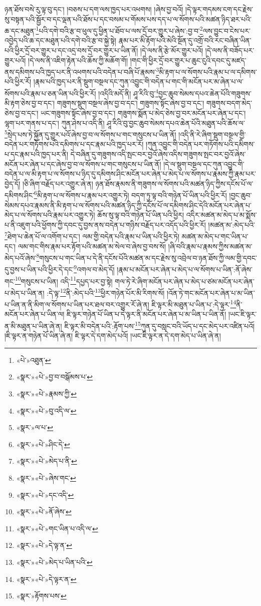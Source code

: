 ཉན་ཐོས་བསེ་རུ་ལྟ་བུ་དང་། །བཅས་པ་དག་ལས་ཁྱད་པར་འཕགས། །ཞེས་བྱ་བའོ། །དེ་ལྟར་གདམས་ངག་དང་རྗེས་སུ་བསྟན་པའི་སྦྱོར་བ་དང་ལྡན་པའི་ཐོས་པ་དང་བསམ་པ་གོམས་པས་དད་པ་ལ་སོགས་པའི་མཚན་ཉིད་ཐར་པའི་ཆ་དང་མཐུན་\footnote{«པེ་»འཐུན་}པའི་དགེ་བའི་རྩ་བ་ཕུལ་དུ་ཕྱིན་པ་ཐོབ་པ་ལས་དྲོ་བར་གྱུར་པ་ཞེས་:བྱ་བ་\footnote{«སྣར་»«པེ་»བྱ་བ་བསྒོམས་པ་}ལས་བྱུང་བ་ངེས་པར་འབྱེད་པའི་ཆ་དང་མཐུན་པའི་དགེ་བའི་རྩ་བ་སྐྱེ་སྟེ། རྣམ་པར་མི་རྟོག་པའི་མེའི་སྔོན་དུ་འགྲོ་བའི་རང་བཞིན་ཡིན་པའི་ཕྱིར་དྲོ་བར་གྱུར་པ་དང་འདྲ་བས་དྲོ་བར་གྱུར་པ་ཡིན་ནོ། །དེ་ལས་ནི་རྩེ་མོར་གྱུར་པའོ། །དེ་ལས་ནི་བཟོད་པར་གྱུར་པའོ། །དེ་ལས་ནི་འཇིག་རྟེན་པའི་ཆོས་ཀྱི་མཆོག་གོ། །གང་གི་ཕྱིར་དྲོ་བར་གྱུར་པ་ཆུང་ངུའི་དབང་དུ་མཛད་ནས་དམིགས་པའི་ཁྱད་པར་ནི་འཕགས་པའི་བདེན་པ་བཞི་པོ་རྣམས་\footnote{«སྣར་»«པེ་»རྣམས་ཀྱི་}མི་རྟག་པ་ལ་སོགས་པའི་རྣམ་པ་ལ་དམིགས་པའི་ཕྱིར་རོ། །རྣམ་པའི་ཁྱད་པར་ནི་སྡུག་བསྔལ་དང་ཀུན་འབྱུང་གི་བདེན་པ་གང་གི་མངོན་པར་མ་ཞེན་པ་ལ་སོགས་པའི་རྣམ་པ་ཅན་ཡིན་པའི་ཕྱིར་རོ། །འདིའི་མདོ་ནི། ཤཱ་རིའི་བུ་\footnote{«སྣར་»«པེ་»བུ་འདི་ལ་}བྱང་ཆུབ་སེམས་དཔའ་ཆེན་པོའི་གཟུགས་མི་རྟག་ཅེས་བྱ་བ་དང་། གཟུགས་སྡུག་བསྔལ་ཞེས་བྱ་བ་དང་། གཟུགས་སྟོང་ཞེས་བྱ་བ་དང་། གཟུགས་བདག་མེད་ཅེས་བྱ་བ་དང་། ཡང་གཟུགས་སྟོང་ཞེས་བྱ་བ་དང་། གཟུགས་སྨོན་པ་མེད་ཅེས་བྱ་བར་མངོན་པར་ཞེན་པ་དང་། ལྷག་པར་གནས་པ་དང་། ཀུན་ཤེས་པ་འདི་ནི། ཤཱ་རིའི་བུ་བྱང་ཆུབ་སེམས་དཔའ་ཆེན་པོའི་མཐུན་པའི་ཆོས་ལ་\footnote{«སྣར་»ལ་པ་}སྲེད་པས་ཏེ་སྐྱོན་དུ་གྱུར་པའོ་ཞེས་བྱ་བ་ལ་སོགས་པ་གང་གསུངས་པ་ཡིན་ནོ། །འདི་ནི་རེ་ཞིག་སྡུག་བསྔལ་གྱི་བདེན་པར་གཏོགས་པའི་དམིགས་པ་དང་རྣམ་པའི་ཁྱད་པར་རོ། །ཀུན་འབྱུང་གི་བདེན་པར་གཏོགས་པའི་དམིགས་པ་དང་རྣམ་པའི་ཁྱད་པར་ནི། དེ་བཞིན་དུ་གཟུགས་འདི་སྤང་བར་བྱའོ་ཞེས་འདིས་གཟུགས་སྤང་བར་བྱའོ་ཞེས་མངོན་པར་ཞེན་པ་དང་ཞེས་བྱ་བ་ལ་སོགས་པ་གང་གསུངས་པ་ཡིན་ནོ། །དེ་ལ་སྡུག་བསྔལ་དང་ཀུན་འབྱུང་གི་བདེན་པ་ལ་མི་རྟག་པ་ལ་སོགས་པ་ཉིད་དུ་དམིགས་ཤིང་མངོན་པར་ཞེན་པ་མེད་པ་ལ་སོགས་པ་རྣམས་ཀྱི་རྣམ་པར་བྱེད་དོ། །ཅི་ཞིག་བརྗོད་པར་འགྱུར་ཞེ་ན། ཉན་ཐོས་རྣམས་ནི་གཟུགས་ལ་སོགས་པའི་མཚན་ཉིད་ཀྱིས་དངོས་པོ་ལ་དམིགས་ཤིང་\footnote{«སྣར་»«པེ་»ཤིང་དེ་}མི་རྟག་པ་ལ་སོགས་པ་རྣམ་པར་འགྱུར་ཏེ། བདག་ཏུ་ལྟ་བའི་གཉེན་པོ་ཡིན་པའི་ཕྱིར་རོ། །བྱང་ཆུབ་སེམས་དཔའ་རྣམས་ནི་མི་རྟག་པ་ལ་སོགས་པའི་མཚན་ཉིད་ཀྱི་དངོས་པོ་ལ་དམིགས་ཤིང་དེའི་མངོན་པར་ཞེན་པ་མེད་པ་ལ་སོགས་པའི་རྣམ་པར་འགྱུར་ཏེ། ཆོས་སུ་ལྟ་བའི་གཉེན་པོ་ཡིན་པའི་ཕྱིར། འདིར་མཚན་མ་མེད་པ་མ་སྨོས་པ་ནི་འཇུག་པའི་ཕྱོགས་ཀྱི་དབང་དུ་བྱས་ནས་བདེན་པ་གཉིས་བརྗོད་པར་འདོད་པའི་ཕྱིར་རོ། །མཚན་མ་:མེད་པའི་\footnote{«སྣར་»«པེ་»མེད་པ་ནི་}ཐེག་པ་ཆེན་པོ་ལ་འགོག་པ་དང་། ལམ་གྱི་བདེན་པའི་རྣམ་པ་ཡིན་པའི་ཕྱིར་ཏེ། མཚན་མ་མེད་པ་གང་ཡིན་པ་དང་། ལམ་གང་གིས་རྣམ་པར་རྟོག་པའི་མཚན་མ་སེལ་བ་ཞེས་བྱ་བས་སོ། །ཞི་བའི་རྣམ་པ་རྣམས་ཀྱིས་མཚན་མ་མེད་པའོ་ཞེས་\footnote{«སྣར་»«པེ་»ཞེས་གང་}གསུངས་པ་གང་ཡིན་པ་དེ་ནི་དངོས་པོའི་མཚན་མ་དང་རྗེས་སུ་འབྲེལ་བ་ཉན་ཐོས་ཀྱི་ལམ་གྱི་དབང་དུ་བྱས་པ་ཡིན་པའི་ཕྱིར་དེ་དང་\footnote{«སྣར་»«པེ་»དང་འདི་}འགལ་བ་མེད་དོ། །རྣམ་པ་མངོན་པར་ཞེན་པ་མེད་པ་ལ་སོགས་པ་ཡིན་:ནོ་ཞེས་གང་\footnote{«སྣར་»«པེ་»ནོ་ཞེས་}གསུངས་པ་ཡིན། འདི་\footnote{«སྣར་»«པེ་»གང་ཡིན་པ་འདི་ལ་}དཔྱད་པར་བྱ་སྟེ། གལ་ཏེ་རེ་ཞིག་མངོན་པར་ཞེན་པ་མེད་པ་ཙམ་མངོན་པར་ཞེན་པ་མེད་པ་ཡིན་ན། :དེ་ལྟ་\footnote{«སྣར་»«པེ་»དེ་ལྟ་ན་}ནི་:མེད་པའི་\footnote{«སྣར་»«པེ་»མེད་པ་ཡིན་པའི་}ཕྱིར་གཉེན་པོར་མི་རིགས་སོ། །འོན་ཏེ་གང་མངོན་པར་ཞེན་པ་མ་ཡིན་པ་ཡིན་ན་ནི་མིག་ལ་སོགས་པ་ཡིན་པར་ཐལ་བར་འགྱུར་རོ་ཞེ་ན། ཇི་ལྟར་མི་མཐུན་པ་ཡིན་པ་:དེ་ལྟར་\footnote{«སྣར་»«པེ་»དེ་ལྟར་ན་}ནི་མངོན་པར་ཞེན་པ་ཡིན་ལ། ཇི་ལྟར་གཉེན་པོ་ཡིན་པ་དེ་ལྟར་ནི་མངོན་པར་ཞེན་པ་མ་ཡིན་པ་ཡིན་ནོ། །ཡང་ཇི་ལྟར་ན་མི་མཐུན་པ་ཡིན་ཞེ་ན། ཇི་ལྟར་མི་བདེན་པའི་:རྟོག་པས་\footnote{«སྣར་»རྟོགས་པས་}ཀུན་དུ་བསླང་བའི་ཡོད་པ་དང་མེད་པར་འཛིན་པའོ། །ཇི་ལྟར་ན་གཉེན་པོ་ཡིན་ཞེ་ན། ཇི་ལྟར་དེ་དག་མེད་པའོ། །ཡང་ཇི་ལྟར་ན་དེ་དག་མེད་པ་ཡིན་ཞེ་ན། 